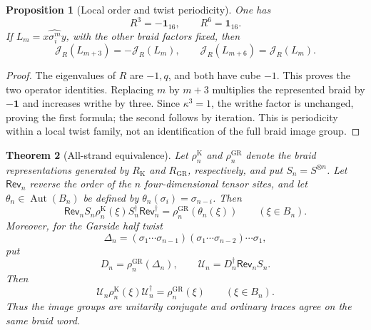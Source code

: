 \documentclass[11pt]{article}
\newtheorem{theorem}{Theorem}[section]
\newtheorem{proposition}[theorem]{Proposition}
\theoremstyle{remark}
\newcommand{\Id}{\mathbf 1}
\begin{document}
\begin{proposition}[Local order and twist periodicity]\label{prop:twists}
One has
\[
  R^3=-\Id_{16},\qquad R^6=\Id_{16}.
\]
If \(L_m=\widehat{x\sigma_i^m y}\), with the other braid factors fixed, then
\[
  \mathcal J_R(L_{m+3})=-\mathcal J_R(L_m),\qquad
  \mathcal J_R(L_{m+6})=\mathcal J_R(L_m).
\]
\end{proposition}

\begin{proof}
The eigenvalues of \(R\) are \(-1,q\), and both have cube \(-1\).  This proves
the two operator identities.  Replacing \(m\) by \(m+3\) multiplies the
represented braid by \(-\Id\) and increases writhe by three.  Since
\(\kappa^3=1\), the writhe factor is unchanged, proving the first formula; the
second follows by iteration.  This is periodicity within a local twist family,
not an identification of the full braid image group.
\end{proof}

\begin{theorem}[All-strand equivalence]\label{thm:all-strand}
Let \(\rho_n^{\mathrm K}\) and \(\rho_n^{\mathrm{GR}}\) denote the braid
representations generated by \(R_{\mathrm K}\) and \(R_{\mathrm{GR}}\),
respectively, and put \(S_n=S^{\otimes n}\).  Let
\(\mathsf{Rev}_n\) reverse the order of the \(n\) four-dimensional tensor
sites, and let \(\theta_n\in\operatorname{Aut}(B_n)\) be defined by
\(\theta_n(\sigma_i)=\sigma_{n-i}\).  Then
\begin{equation}
  \mathsf{Rev}_nS_n\rho_n^{\mathrm K}(\xi)
  S_n^\dagger\mathsf{Rev}_n^\dagger
  =\rho_n^{\mathrm{GR}}(\theta_n(\xi))
  \qquad(\xi\in B_n).
  \label{eq:reflected-global}
\end{equation}
Moreover, for the Garside half twist
\[
  \Delta_n=(\sigma_1\cdots\sigma_{n-1})
  (\sigma_1\cdots\sigma_{n-2})\cdots\sigma_1,
\]
put
\[
  D_n=\rho_n^{\mathrm{GR}}(\Delta_n),\qquad
  \mathcal U_n=D_n^\dagger\mathsf{Rev}_nS_n.
\]
Then
\begin{equation}
  \mathcal U_n\rho_n^{\mathrm K}(\xi)\mathcal U_n^\dagger
  =\rho_n^{\mathrm{GR}}(\xi)
  \qquad(\xi\in B_n).
  \label{eq:same-word-global}
\end{equation}
Thus the image groups are unitarily conjugate and ordinary traces agree on the
same braid word.
\end{theorem}
\end{document}

